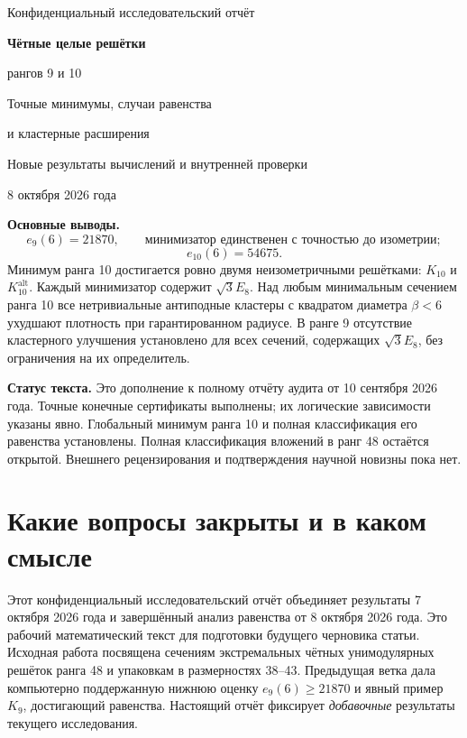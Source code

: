 \documentclass[11pt,a4paper]{article}
\theoremstyle{remark}\newtheorem{remark}[theorem]{Замечание}
\newcommand{\Kalt}{K_{10}^{\mathrm{alt}}}
\begin{document}
\begin{titlepage}
\vspace*{18mm}
{\Large\sffamily Конфиденциальный исследовательский отчёт\par}
\vspace{14mm}
{\huge\bfseries Чётные целые решётки\par рангов 9 и 10\par}
\vspace{9mm}
{\Large Точные минимумы, случаи равенства\par и кластерные расширения\par}
\vspace{12mm}
{\large Новые результаты вычислений и внутренней проверки\par 8 октября 2026 года\par}
\vspace{14mm}
\textbf{Основные выводы.}
\[
e_9(6)=21870,\qquad \text{минимизатор единственен с точностью до изометрии};
\]
\[
e_{10}(6)=54675.
\]
Минимум ранга 10 достигается ровно двумя неизометричными решётками: $K_{10}$ и $\Kalt$. Каждый минимизатор содержит $\sqrt3E_8$. Над любым минимальным сечением ранга 10 все нетривиальные антиподные кластеры с квадратом диаметра $\beta<6$ ухудшают плотность при гарантированном радиусе. В ранге 9 отсутствие кластерного улучшения установлено для всех сечений, содержащих $\sqrt3E_8$, без ограничения на их определитель.

\vfill
\textbf{Статус текста.} Это дополнение к полному отчёту аудита от 10 сентября 2026 года. Точные конечные сертификаты выполнены; их логические зависимости указаны явно. Глобальный минимум ранга 10 и полная классификация его равенства установлены. Полная классификация вложений в ранг 48 остаётся открытой. Внешнего рецензирования и подтверждения научной новизны пока нет.
\end{titlepage}
{\small\tableofcontents}
\newpage

\section{Какие вопросы закрыты и в каком смысле}

Этот конфиденциальный исследовательский отчёт объединяет результаты 7 октября 2026 года и завершённый анализ равенства от 8 октября 2026 года. Это рабочий математический текст для подготовки будущего черновика статьи. Исходная работа посвящена сечениям экстремальных чётных унимодулярных решёток ранга 48 и упаковкам в размерностях 38--43. Предыдущая ветка дала компьютерно поддержанную нижнюю оценку $e_9(6)\ge21870$ и явный пример $K_9$, достигающий равенства. Настоящий отчёт фиксирует \emph{добавочные} результаты текущего исследования.
\end{document}

